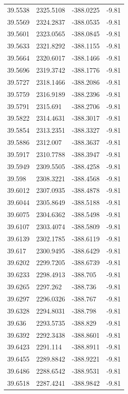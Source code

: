 \begin{table}[H]
\begin{tabular}{llll}
39.5538 & 2325.5108 & -388.0225 & -9.81 \\
39.5569 & 2324.2837 & -388.0535 & -9.81 \\
39.5601 & 2323.0565 & -388.0845 & -9.81 \\
39.5633 & 2321.8292 & -388.1155 & -9.81 \\
39.5664 & 2320.6017 & -388.1466 & -9.81 \\
39.5696 & 2319.3742 & -388.1776 & -9.81 \\
39.5727 & 2318.1466 & -388.2086 & -9.81 \\
39.5759 & 2316.9189 & -388.2396 & -9.81 \\
39.5791 & 2315.691 & -388.2706 & -9.81 \\
39.5822 & 2314.4631 & -388.3017 & -9.81 \\
39.5854 & 2313.2351 & -388.3327 & -9.81 \\
39.5886 & 2312.007 & -388.3637 & -9.81 \\
39.5917 & 2310.7788 & -388.3947 & -9.81 \\
39.5949 & 2309.5505 & -388.4258 & -9.81 \\
39.598 & 2308.3221 & -388.4568 & -9.81 \\
39.6012 & 2307.0935 & -388.4878 & -9.81 \\
39.6044 & 2305.8649 & -388.5188 & -9.81 \\
39.6075 & 2304.6362 & -388.5498 & -9.81 \\
39.6107 & 2303.4074 & -388.5809 & -9.81 \\
39.6139 & 2302.1785 & -388.6119 & -9.81 \\
39.617 & 2300.9495 & -388.6429 & -9.81 \\
39.6202 & 2299.7205 & -388.6739 & -9.81 \\
39.6233 & 2298.4913 & -388.705 & -9.81 \\
39.6265 & 2297.262 & -388.736 & -9.81 \\
39.6297 & 2296.0326 & -388.767 & -9.81 \\
39.6328 & 2294.8031 & -388.798 & -9.81 \\
39.636 & 2293.5735 & -388.829 & -9.81 \\
39.6392 & 2292.3438 & -388.8601 & -9.81 \\
39.6423 & 2291.114 & -388.8911 & -9.81 \\
39.6455 & 2289.8842 & -388.9221 & -9.81 \\
39.6486 & 2288.6542 & -388.9531 & -9.81 \\
39.6518 & 2287.4241 & -388.9842 & -9.81 \\

\end{tabular}
\end{table}
